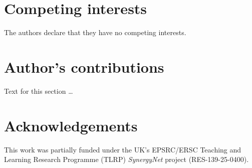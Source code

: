 \documentclass{bmcart}
\begin{document}
\begin{backmatter}

\section*{Competing interests}
  The authors declare that they have no competing interests.

\section*{Author's contributions}
    Text for this section \ldots

\section*{Acknowledgements}

This work was partially funded under the UK's EPSRC/ERSC Teaching and Learning Research Programme (TLRP) {\emph{SynergyNet}} project (RES-139-25-0400).





\end{backmatter}
\end{document}
